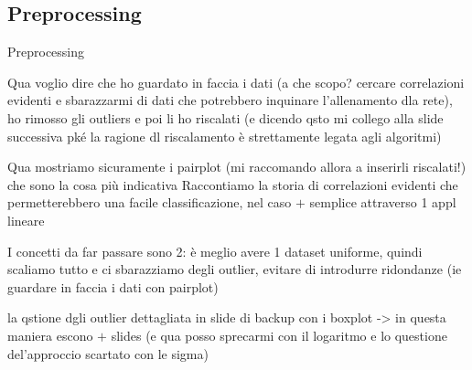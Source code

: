 \documentclass{beamer}
\begin{document}
\subsection{Preprocessing}
\begin{frame}{Preprocessing}

  {\scriptsize
  Qua voglio dire che ho guardato in faccia i dati (a che scopo? cercare correlazioni evidenti e sbarazzarmi di dati che potrebbero inquinare l'allenamento dla rete), ho rimosso gli outliers e poi li ho riscalati (e dicendo qsto mi collego alla slide successiva pké la ragione dl riscalamento è strettamente legata agli algoritmi)

  Qua mostriamo sicuramente i pairplot (mi raccomando allora a inserirli riscalati!) che sono la cosa più indicativa   
  Raccontiamo la storia di correlazioni evidenti che permetterebbero una facile classificazione, nel caso $+$ semplice attraverso 1 appl lineare

  I concetti da far passare sono 2: è meglio avere 1 dataset uniforme, quindi scaliamo tutto e ci sbarazziamo degli outlier, evitare di introdurre ridondanze (ie guardare in faccia i dati con pairplot)
  }

  {\scriptsize
  la qstione dgli outlier dettagliata in slide di backup con i boxplot -> in questa maniera escono $+$ slides (e qua posso sprecarmi con il logaritmo e lo questione del'approccio scartato con le sigma)
  }
\end{frame}
\end{document}
